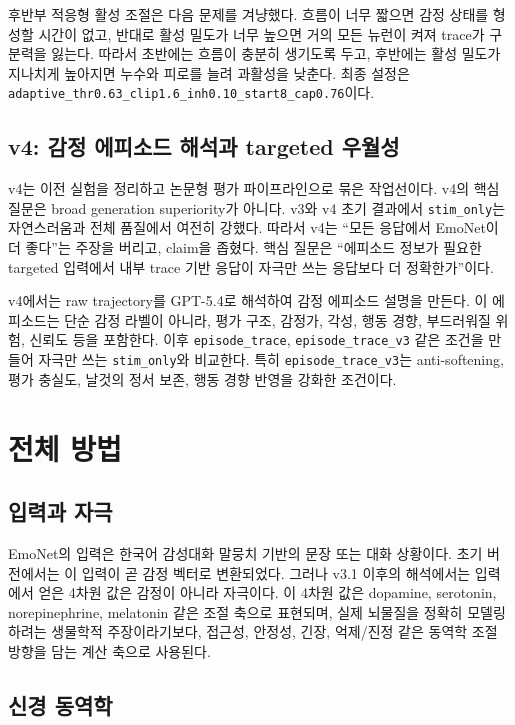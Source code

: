 \documentclass[11pt,a4paper]{article}
\newcommand{\eng}[1]{\texttt{#1}}
\begin{document}
후반부 적응형 활성 조절은 다음 문제를 겨냥했다. 흐름이 너무 짧으면 감정 상태를 형성할 시간이 없고, 반대로 활성 밀도가 너무 높으면 거의 모든 뉴런이 켜져 trace가 구분력을 잃는다. 따라서 초반에는 흐름이 충분히 생기도록 두고, 후반에는 활성 밀도가 지나치게 높아지면 누수와 피로를 늘려 과활성을 낮춘다. 최종 설정은 \eng{adaptive\_thr0.63\_clip1.6\_inh0.10\_start8\_cap0.76}이다.

\subsection{v4: 감정 에피소드 해석과 targeted 우월성}

v4는 이전 실험을 정리하고 논문형 평가 파이프라인으로 묶은 작업선이다. v4의 핵심 질문은 broad generation superiority가 아니다. v3와 v4 초기 결과에서 \eng{stim\_only}는 자연스러움과 전체 품질에서 여전히 강했다. 따라서 v4는 ``모든 응답에서 EmoNet이 더 좋다''는 주장을 버리고, claim을 좁혔다. 핵심 질문은 ``에피소드 정보가 필요한 targeted 입력에서 내부 trace 기반 응답이 자극만 쓰는 응답보다 더 정확한가''이다.

v4에서는 raw trajectory를 GPT-5.4로 해석하여 감정 에피소드 설명을 만든다. 이 에피소드는 단순 감정 라벨이 아니라, 평가 구조, 감정가, 각성, 행동 경향, 부드러워질 위험, 신뢰도 등을 포함한다. 이후 \eng{episode\_trace}, \eng{episode\_trace\_v3} 같은 조건을 만들어 자극만 쓰는 \eng{stim\_only}와 비교한다. 특히 \eng{episode\_trace\_v3}는 anti-softening, 평가 충실도, 날것의 정서 보존, 행동 경향 반영을 강화한 조건이다.

\section{전체 방법}

\subsection{입력과 자극}

EmoNet의 입력은 한국어 감성대화 말뭉치 기반의 문장 또는 대화 상황이다. 초기 버전에서는 이 입력이 곧 감정 벡터로 변환되었다. 그러나 v3.1 이후의 해석에서는 입력에서 얻은 4차원 값은 감정이 아니라 자극이다. 이 4차원 값은 dopamine, serotonin, norepinephrine, melatonin 같은 조절 축으로 표현되며, 실제 뇌물질을 정확히 모델링하려는 생물학적 주장이라기보다, 접근성, 안정성, 긴장, 억제/진정 같은 동역학 조절 방향을 담는 계산 축으로 사용된다.

\subsection{신경 동역학}
\end{document}
